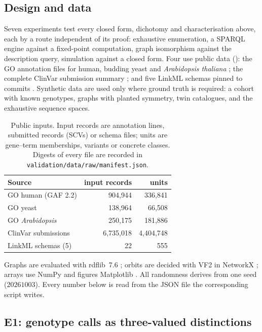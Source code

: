\documentclass[11pt,twocolumn,a4paper]{article}
\theoremstyle{plain}
\theoremstyle{definition}
\theoremstyle{remark}
\begin{document}
\subsection{Design and data}

Seven experiments test every closed form, dichotomy and characterisation above,
each by a route independent of its proof: exhaustive enumeration, a SPARQL
engine against a fixed-point computation, graph isomorphism against the
description query, simulation against a closed form. Four use public data
(): the GO annotation files for human, budding yeast and
\emph{Arabidopsis thaliana} \citep{go2023}; the complete ClinVar submission
summary \citep{landrum2018}; and five LinkML schemas pinned to commits
\citep{mixs_repo,ghga_repo,nmdc_repo,chemdcat_repo,dcatplus_repo}. Synthetic data
are used only where ground truth is required: a cohort with known genotypes,
graphs with planted symmetry, twin catalogues, and the exhaustive sequence
spaces.

\begin{table}[t]
\centering\small
\caption{Public inputs. Input records are annotation lines, submitted
records (SCVs) or schema files; units are gene--term memberships, variants
or concrete classes. Digests of every file are recorded in
\texttt{validation/data/raw/manifest.json}.}
\label{tab:data}
\begin{tabular}{@{}lrr@{}}
\toprule
Source & input records & units\\
\midrule
GO human (GAF 2.2) & 904{,}944 & 336{,}841\\
GO yeast & 138{,}964 & 66{,}508\\
GO \emph{Arabidopsis} & 250{,}175 & 181{,}886\\
ClinVar submissions & 6{,}735{,}018 & 4{,}404{,}748\\
LinkML schemas (5) & 22 & 555\\
\bottomrule
\end{tabular}
\end{table}

Graphs are evaluated with rdflib~7.6 \citep{rdflib}; orbits are decided with
VF2 \citep{cordella2004} in NetworkX \citep{hagberg2008}; arrays use NumPy
\citep{harris2020numpy} and figures Matplotlib \citep{hunter2007}. All
randomness derives from one seed ($20261003$). Every number below is read from
the JSON file the corresponding script writes.

\subsection{E1: genotype calls as three-valued distinctions}
\label{sec:e1}
\end{document}
